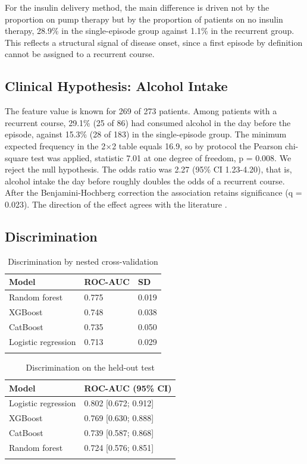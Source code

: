\documentclass[pdflatex,sn-basic,Numbered]{sn-jnl}
\begin{document}
For the insulin delivery method, the main difference is driven not by the proportion on pump therapy but by the proportion of patients on no insulin therapy, 28.9\% in the single-episode group against 1.1\% in the recurrent group. This reflects a structural signal of disease onset, since a first episode by definition cannot be assigned to a recurrent course.

\subsection{Clinical Hypothesis: Alcohol Intake}\label{subsec3_2}

The feature value is known for 269 of 273 patients. Among patients with a recurrent course, 29.1\% (25 of 86) had consumed alcohol in the day before the episode, against 15.3\% (28 of 183) in the single-episode group. The minimum expected frequency in the 2$\times$2 table equals 16.9, so by protocol the Pearson chi-square test was applied, statistic 7.01 at one degree of freedom, p = 0.008. We reject the null hypothesis. The odds ratio was 2.27 (95\% CI 1.23-4.20), that is, alcohol intake the day before roughly doubles the odds of a recurrent course. After the Benjamini-Hochberg correction the association retains significance (q = 0.023). The direction of the effect agrees with the literature \cite{ref7,ref9,ref16}.

\subsection{Discrimination}\label{subsec3_3}

\begin{table}[h]
\caption{Discrimination by nested cross-validation}\label{tab2}%
\begin{tabular}{@{}lll@{}}
\toprule
Model & ROC-AUC & SD\\
\midrule
Random forest & 0.775 & 0.019\\
XGBoost & 0.748 & 0.038\\
CatBoost & 0.735 & 0.050\\
Logistic regression & 0.713 & 0.029\\
\botrule
\end{tabular}
\end{table}

\begin{table}[h]
\caption{Discrimination on the held-out test}\label{tab3}%
\begin{tabular}{@{}ll@{}}
\toprule
Model & ROC-AUC (95\% CI)\\
\midrule
Logistic regression & 0.802 [0.672; 0.912]\\
XGBoost & 0.769 [0.630; 0.888]\\
CatBoost & 0.739 [0.587; 0.868]\\
Random forest & 0.724 [0.576; 0.851]\\
\botrule
\end{tabular}
\end{table}
\end{document}
